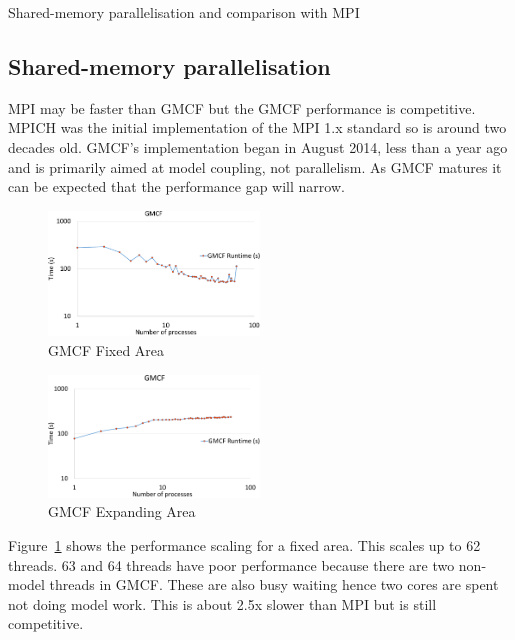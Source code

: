 Shared-memory parallelisation and comparison with MPI

\subsection{Shared-memory parallelisation}

MPI may be faster than GMCF but the GMCF performance is competitive. MPICH was
the initial implementation of the MPI 1.x standard so is around two decades old.
GMCF's implementation began in August 2014, less than a year ago and is
primarily aimed at model coupling, not parallelism. As GMCF matures it can be
expected that the performance gap will narrow.

\begin{figure}
    \includegraphics[page=1,width=0.5\textwidth]
    {graphs/gmcfThreadPinningFasterSorNoREQDATAnewAPISpinBusyWaitFixedArea-crop.pdf}
    \caption{GMCF Fixed Area}
    \label{fig:gmcffixedarea}
\end{figure}

\begin{figure}
    \includegraphics[page=1,width=0.5\textwidth]    {graphs/gmcfThreadPinningFasterSorNoREQDATAnewAPISpinBusyWaitExpandingArea-crop.pdf}
    \caption{GMCF Expanding Area}
    \label{fig:gmcfexpandingarea}
\end{figure}

Figure~\ref{fig:gmcffixedarea} shows the performance scaling for a fixed area.
This scales up to 62 threads. 63 and 64 threads have poor performance because
there are two non-model threads in GMCF. These are also busy waiting hence two
cores are spent not doing model work. This is about 2.5x slower than MPI but is
still competitive.

